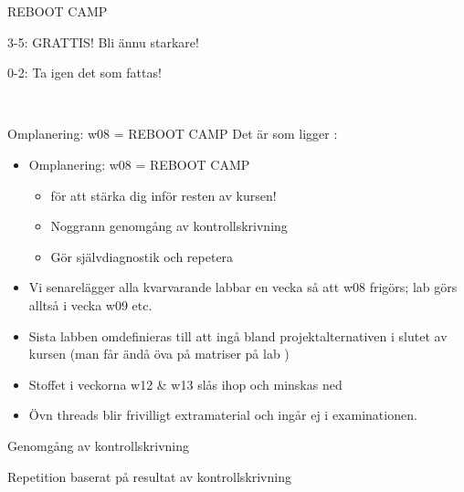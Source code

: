 
\begin{Slide}{REBOOT CAMP}
\huge 

3-5: GRATTIS! Bli ännu starkare!

0-2: Ta igen det som fattas!

\vspace{0.5em}  \\\vspace{0.5em} 
\end{Slide}


\begin{Slide}{Omplanering: w08 = REBOOT CAMP}
Det är  som ligger : \\
\begin{itemize}
\item Omplanering: w08 = REBOOT CAMP
\begin{itemize}
\item {} för att stärka dig inför resten av kursen!
\item Noggrann genomgång av kontrollskrivning
\item Gör självdiagnostik och repetera
\end{itemize}
\item Vi senarelägger alla kvarvarande labbar en vecka så att w08 frigörs;
 lab  görs alltså i vecka w09 etc.

\item Sista labben  omdefinieras till att ingå bland projektalternativen i slutet av kursen (man får ändå öva på matriser på lab )

\item Stoffet i veckorna w12 \& w13 slås ihop och minskas ned

\item Övn threads blir frivilligt extramaterial och ingår ej i examinationen.

\end{itemize}
\end{Slide}

\begin{Slide}{Genomgång av kontrollskrivning}
\end{Slide}


\begin{Slide}{Repetition baserat på resultat av kontrollskrivning}
\end{Slide}


\fi












